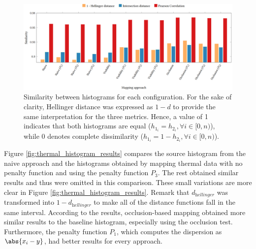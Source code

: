 \begin{figure}
    \centering
    \includegraphics[width=\linewidth]{figs/thermal_projection/distance_similarity.png}
	\caption{Similarity between histograms for each configuration. For the sake of clarity, Hellinger distance was expressed as $1 - d$ to provide the same interpretation for the three metrics. Hence, a value of 1 indicates that both histograms are equal ($h_{1_{i}} = h_{2_{i}}, \forall i \in [0, n)$), while 0 denotes complete dissimilarity ($h_{1_{i}} = 1 - h_{2_{i}}, \forall i \in [0, n)$).}
	\label{fig:thermal_histogram_results_02}
\end{figure}


Figure \ref{fig:thermal_histogram_results} compares the source histogram from the naive approach and the histograms obtained by mapping thermal data with no penalty function and using the penalty function $P_3$. The rest obtained similar results and thus were omitted in this comparison. These small variations are more clear in Figure \ref{fig:thermal_histogram_results}. Remark that $d_{\textit{hellinger}}$ was transformed into $1 - d_{\textit{hellinger}}$ to make all of the distance functions fall in the same interval. According to the results, occlusion-based mapping obtained more similar results to the baseline histogram, especially using the occlusion test. Furthermore, the penalty function $P_1$, which computes the dispersion as $\abs{x_i - y}$, had better results for every approach.

